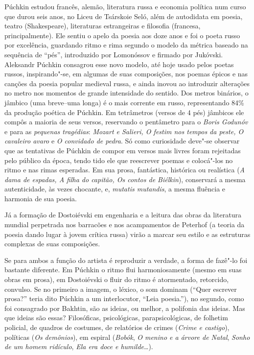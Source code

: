 Púchkin estudou francês, alemão, literatura russa e economia política
num curso que durou seis anos, no Liceu de Tsárskoie Seló, além de autodidata em poesia, teatro (Shakespeare), literaturas estrangeiras e filosofia (francesa, principalmente). Ele sentiu o apelo da poesia aos doze anos e foi o poeta russo por excelência, guardando ritmo e rima segundo o modelo da métrica baseado na sequência de ``pés'', introduzido por Lomonóssov e firmado por Jukóvski. Aleksandr Púchkin consagrou esse novo modelo, até hoje usado pelos poetas russos, inspirando"-se, em algumas de suas composições, nos poemas épicos e nas canções da poesia popular medieval russa, e ainda inovou ao introduzir alterações no metro nos momentos de grande intensidade do sentido. Dos metros binários, o jâmbico (uma breve--uma longa) é o mais corrente em russo, representando 84\% da produção poética de Púchkin. Em tetrâmetros (versos de 4 pés) jâmbicos ele compôs a maioria de seus versos, reservando o pentâmetro para o \emph{Boris Godunóv} e para as \emph{pequenas tragédias}: \emph{Mozart e Salieri, O festim nos tempos da peste, O cavaleiro avaro} e \emph{O convidado de pedra}. Só como curiosidade deve"-se observar que as tentativas de Púchkin de compor em versos mais livres foram rejeitadas pelo público da época, tendo tido ele que reescrever poemas e colocá"-los no ritmo e nas rimas esperadas. Em sua prosa, fantástica, histórica ou realística (\emph{A dama de espadas, A filha do capitão, Os contos de Biélkin}), conservará a mesma autenticidade, às vezes chocante, e, \emph{mutatis mutandis}, a mesma fluência e harmonia de sua poesia.

Já a formação de Dostoiévski em engenharia e a leitura das obras
da literatura mundial perpetrada nos barracões e nos acampamentos de
Peterhof (a teoria da poesia dando lugar à jovem crítica russa) virão a marcar seu estilo e as estruturas complexas de suas composições.

Se para ambos a função do artista é reproduzir a verdade, a forma
de fazê"-lo foi bastante diferente. Em Púchkin o ritmo flui
harmoniosamente (mesmo em suas obras em prosa), em Dostoiévski o
fluir do ritmo é atormentado, retorcido, convulso. Se no primeiro
a imagem, o léxico, o som dominam (``Quer escrever prosa?'' teria
dito Púchkin a um interlocutor, ``Leia poesia.''), no segundo,
como foi consagrado por Bakhtin, são as ideias, ou melhor, a
polifonia das ideias. Mas que ideias são essas? Filosóficas, psicológicas, parapsicológicas, de folhetim policial, de quadros de costumes, de relatórios de crimes (\emph{Crime e
castigo}), políticas (\emph{Os demônios}), em espiral
(\emph{Bobók}, \emph{O menino e a árvore de Natal}, \emph{Sonho de um homem ridículo}, \emph{Ela era doce e humilde}\ldots{}).

